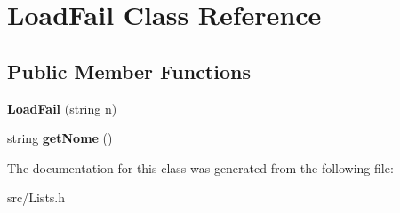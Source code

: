 \hypertarget{class_load_fail}{}\section{Load\+Fail Class Reference}
\label{class_load_fail}
\subsection*{Public Member Functions}
\begin{DoxyCompactItemize}
\item 
\hypertarget{class_load_fail_a6f9c899a8e8007a40669fbe6613b332c}{}{\bfseries Load\+Fail} (string n)\label{class_load_fail_a6f9c899a8e8007a40669fbe6613b332c}

\item 
\hypertarget{class_load_fail_a75bcaf32324f43b3561acaaf5ba5dc43}{}string {\bfseries get\+Nome} ()\label{class_load_fail_a75bcaf32324f43b3561acaaf5ba5dc43}

\end{DoxyCompactItemize}


The documentation for this class was generated from the following file\+:\begin{DoxyCompactItemize}
\item 
src/Lists.\+h\end{DoxyCompactItemize}
